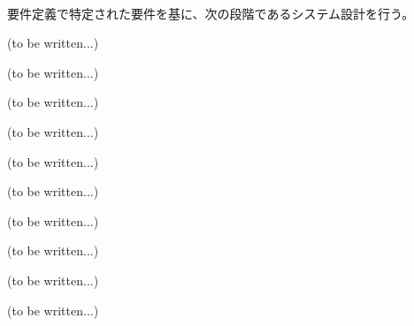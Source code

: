 {\paragraph*{\tpartnextstep}
要件定義で特定された要件を基に、次の段階であるシステム設計を行う。
}







(to be written...)



(to be written...)



(to be written...)



(to be written...)







(to be written...)



(to be written...)



(to be written...)







(to be written...)



(to be written...)



(to be written...)




